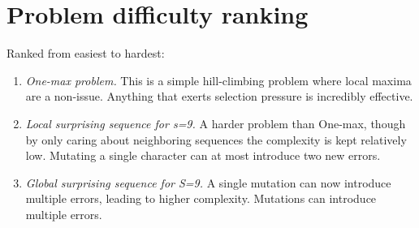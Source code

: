 \section{Problem difficulty ranking}

Ranked from easiest to hardest:

\begin{enumerate}
\item \emph{One-max problem.} This is a simple hill-climbing problem where local maxima are a non-issue. Anything that exerts selection pressure is incredibly effective.

\item \emph{Local surprising sequence for s=9.} A harder problem than One-max, though by only caring about neighboring sequences the complexity is kept relatively low. Mutating a single character can at most introduce two new errors.

\item \emph{Global surprising sequence for S=9.} A single mutation can now introduce multiple errors, leading to higher complexity. Mutations can introduce multiple errors.

\end{enumerate}
